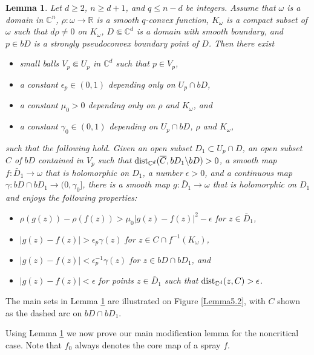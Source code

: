 \documentclass[11pt]{amsart}
\numberwithin{equation}{section}
\newtheorem{lemma}[theorem]{Lemma}
\theoremstyle{definition}
\begin{document}
\begin{lemma}
\label{LemmaDorL}
Let $d\ge 2$, $n\ge d+1$, and $q\le n-d$ be integers. 
Assume that $\omega$ is a domain in ${\mathbb{C}}^n$,
$\rho\colon\omega \to{\mathbb{R}}$ is a smooth $q$-convex function, 
$K_\omega$ is a compact subset of $\omega$ such that 
$d\rho\ne 0$ on $K_\omega$, $D{\Subset} {\mathbb{C}}^d$ is a domain with smooth boundary, 
and $p\in bD$ is a strongly pseudoconvex boundary point of $D$.  
Then there exist 
\begin{itemize}
\item[(a)] small balls $V_p\Subset U_p$ in ${\mathbb{C}}^d$ 
such that $p\in V_p$, 
\item[(b)] a constant $\epsilon_p\in (0,1)$ 
depending only on $U_p\cap bD$, 
\item[(c)]  a constant $\mu_0>0$ depending only on $\rho$ and $K_\omega$, and 
\item[(d)] a constant $\gamma_0\in (0,1)$ 
depending on $U_p\cap bD$, $\rho$ and $K_\omega$,
\end{itemize}
such that the following hold.
Given an open subset $D_1\subset U_p\cap D$, 
an open subset $C$ of $bD$ contained in $V_p$ such that 
${\rm dist}_{{\mathbb{C}}^d}(\overline C, bD_1 {\backslash} bD) >0$,
a smooth map $f\colon \bar D_1 \to \omega$ that is holomorphic on $D_1$,
a number ${\epsilon}>0$, and a continuous map $\gamma\colon bD\cap bD_1\to (0,\gamma_0]$,
there is a smooth map $g\colon \bar D_1 \to \omega$ that is
holomorphic on $D_1$ and enjoys the following properties:
\begin{itemize}
\item[(i)] $\rho(g(z))-\rho(f(z)) >\mu_0|g(z)-f(z)|^2-{\epsilon}$ for $z\in \bar D_1$,
\item[(ii)] $|g(z)-f(z)|>{\epsilon}_p\gamma(z)$ for $z\in C\cap f^{-1}(K_\omega)$,
\item[(iii)] $|g(z)-f(z)|<{\epsilon}_p^{-1}\gamma(z)$ for $z\in bD\cap bD_1$, and
\item[(iv)] $|g(z)-f(z)|<{\epsilon}$ for points $z\in \bar D_1$ such that 
${\rm dist}_{{\mathbb{C}}^d}(z,C)>{\epsilon}$.
\end{itemize}
\end{lemma}

The main sets in Lemma \ref{LemmaDorL} are illustrated on Figure \ref{Lemma5.2},
with $C$ shown as the dashed arc on $bD \cap bD_1$.

Using Lemma \ref{LemmaDorL} we now prove 
our main modification lemma for the noncritical case.
Note that $f_0$ always denotes the core map of a spray $f$.
\end{document}
